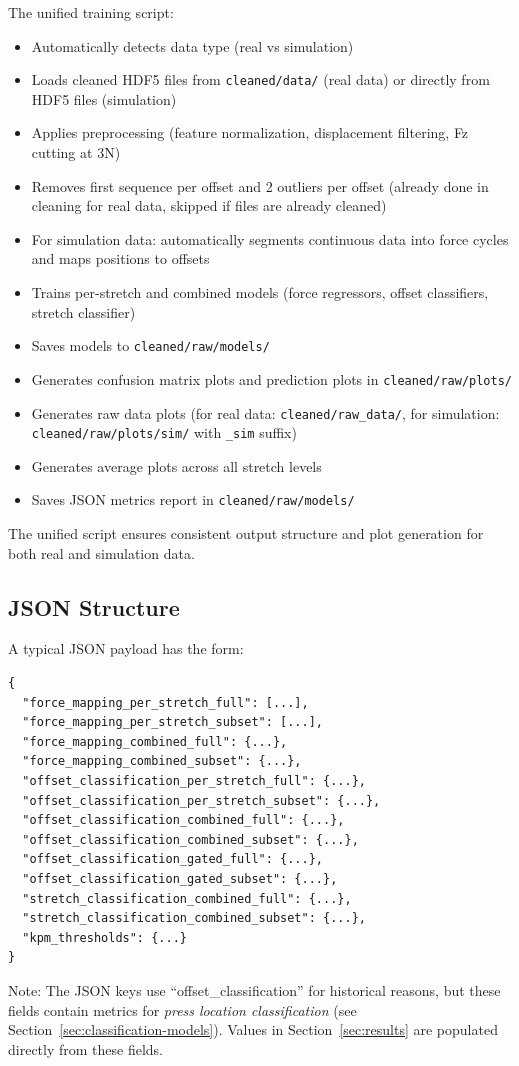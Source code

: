 \documentclass[11pt,a4paper]{article}
\begin{document}
The unified training script:
\begin{itemize}[leftmargin=1.5em]
    \item Automatically detects data type (real vs simulation)
    \item Loads cleaned HDF5 files from \texttt{cleaned/data/} (real data) or directly from HDF5 files (simulation)
    \item Applies preprocessing (feature normalization, displacement filtering, Fz cutting at 3N)
    \item Removes first sequence per offset and 2 outliers per offset (already done in cleaning for real data, skipped if files are already cleaned)
    \item For simulation data: automatically segments continuous data into force cycles and maps positions to offsets
    \item Trains per-stretch and combined models (force regressors, offset classifiers, stretch classifier)
    \item Saves models to \texttt{cleaned/raw/models/}
    \item Generates confusion matrix plots and prediction plots in \texttt{cleaned/raw/plots/}
    \item Generates raw data plots (for real data: \texttt{cleaned/raw\_data/}, for simulation: \texttt{cleaned/raw/plots/sim/} with \texttt{\_sim} suffix)
    \item Generates average plots across all stretch levels
    \item Saves JSON metrics report in \texttt{cleaned/raw/models/}
\end{itemize}
The unified script ensures consistent output structure and plot generation for both real and simulation data.

\subsection{JSON Structure}
A typical JSON payload has the form:
\begin{verbatim}
{
  "force_mapping_per_stretch_full": [...],
  "force_mapping_per_stretch_subset": [...],
  "force_mapping_combined_full": {...},
  "force_mapping_combined_subset": {...},
  "offset_classification_per_stretch_full": {...},
  "offset_classification_per_stretch_subset": {...},
  "offset_classification_combined_full": {...},
  "offset_classification_combined_subset": {...},
  "offset_classification_gated_full": {...},
  "offset_classification_gated_subset": {...},
  "stretch_classification_combined_full": {...},
  "stretch_classification_combined_subset": {...},
  "kpm_thresholds": {...}
}
\end{verbatim}
Note: The JSON keys use ``offset\_classification'' for historical reasons, but these fields contain
metrics for \emph{press location classification} (see Section~\ref{sec:classification-models}).
Values in Section~\ref{sec:results} are populated directly from these fields.
\end{document}
